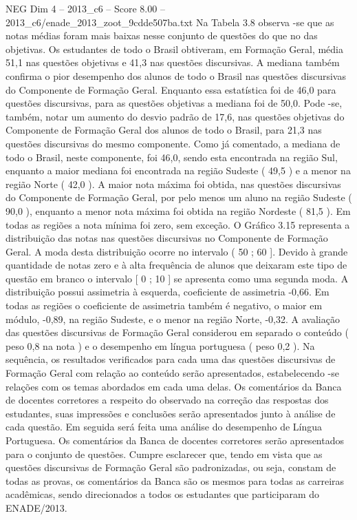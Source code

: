 \begin{textsample}{NEG Dim 4 – 2013\_c6 – Score 8.00 – 2013\_c6/enade\_2013\_zoot\_9cdde507ba.txt}
Na Tabela 3.8 observa -se que as notas médias foram mais baixas nesse conjunto de questões do que no das objetivas.
Os estudantes de todo o Brasil obtiveram, em Formação Geral, média 51,1 nas questões objetivas e 41,3 nas questões discursivas.
A mediana também confirma o pior desempenho dos alunos de todo o Brasil nas questões discursivas do Componente de Formação Geral.
Enquanto essa estatística foi de 46,0 para questões discursivas, para as questões objetivas a mediana foi de 50,0.
Pode -se, também, notar um aumento do desvio padrão de 17,6, nas questões objetivas do Componente de Formação Geral dos alunos de todo o Brasil, para 21,3 nas questões discursivas do mesmo componente.
Como já comentado, a mediana de todo o Brasil, neste componente, foi 46,0, sendo esta encontrada na região Sul, enquanto a maior mediana foi encontrada na região Sudeste ( 49,5 ) e a menor na região Norte ( 42,0 ).
A maior nota máxima foi obtida, nas questões discursivas do Componente de Formação Geral, por pelo menos um aluno na região Sudeste ( 90,0 ), enquanto a menor nota máxima foi obtida na região Nordeste ( 81,5 ).
Em todas as regiões a nota mínima foi zero, sem exceção.
O Gráfico 3.15 representa a distribuição das notas nas questões discursivas no Componente de Formação Geral.
A moda desta distribuição ocorre no intervalo ( 50 ; 60 ].
Devido à grande quantidade de notas zero e à alta frequência de alunos que deixaram este tipo de questão em branco o intervalo [ 0 ; 10 ] se apresenta como uma segunda moda.
A distribuição possui assimetria à esquerda, coeficiente de assimetria -0,66.
Em todas as regiões o coeficiente de assimetria também é negativo, o maior em módulo, -0,89, na região Sudeste, e o menor na região Norte, -0,32.
A avaliação das questões discursivas de Formação Geral considerou em separado o conteúdo ( peso 0,8 na nota ) e o desempenho em língua portuguesa ( peso 0,2 ).
Na sequência, os resultados verificados para cada uma das questões discursivas de Formação Geral com relação ao conteúdo serão apresentados, estabelecendo -se relações com os temas abordados em cada uma delas.
Os comentários da Banca de docentes corretores a respeito do observado na correção das respostas dos estudantes, suas impressões e conclusões serão apresentados junto à análise de cada questão.
Em seguida será feita uma análise do desempenho de Língua Portuguesa.
Os comentários da Banca de docentes corretores serão apresentados para o conjunto de questões.
Cumpre esclarecer que, tendo em vista que as questões discursivas de Formação Geral são padronizadas, ou seja, constam de todas as provas, os comentários da Banca são os mesmos para todas as carreiras acadêmicas, sendo direcionados a todos os estudantes que participaram do ENADE/2013.

\end{textsample}
